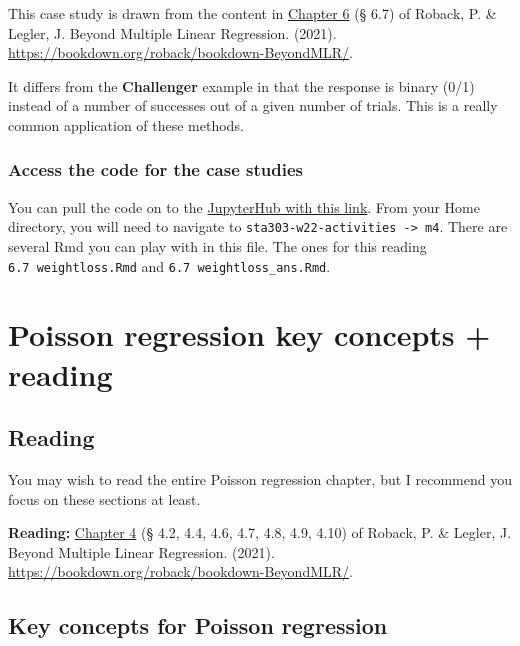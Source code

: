 \documentclass[
  openany]{book}
\begin{document}
This case study is drawn from the content in \href{https://bookdown.org/roback/bookdown-BeyondMLR/ch-logreg.html}{Chapter
6} (§
6.7) of Roback, P. \& Legler, J. Beyond Multiple Linear Regression.
(2021). \url{https://bookdown.org/roback/bookdown-BeyondMLR/}.

It differs from the \textbf{Challenger} example in that the response is
binary (0/1) instead of a number of successes out of a given number of
trials. This is a really common application of these methods.

\hypertarget{access-the-code-for-the-case-studies}{%
\subsubsection{Access the code for the case studies}\label{access-the-code-for-the-case-studies}}

You can pull the code on to the \href{https://jupyter.utoronto.ca/hub/user-redirect/git-pull?repo=https\%3A\%2F\%2Fgithub.com\%2Fsta303-bolton\%2Fsta303-w22-activities\&urlpath=rstudio\%2F}{JupyterHub with this
link}.
From your Home directory, you will need to navigate to
\texttt{sta303-w22-activities\ -\textgreater{}\ m4}. There are several Rmd you can play with
in this file. The ones for this reading \texttt{6.7\ weightloss.Rmd} and
\texttt{6.7\ weightloss\_ans.Rmd}.

\hypertarget{poisson-regression-key-concepts-reading}{%
\section{Poisson regression key concepts + reading}\label{poisson-regression-key-concepts-reading}}

\hypertarget{reading-1}{%
\subsection{Reading}\label{reading-1}}

You may wish to read the entire Poisson regression chapter, but I
recommend you focus on these sections at least.

\textbf{Reading:} \href{https://bookdown.org/roback/bookdown-BeyondMLR/ch-poissonreg.html}{Chapter
4} (§
4.2, 4.4, 4.6, 4.7, 4.8, 4.9, 4.10) of Roback, P. \& Legler, J. Beyond
Multiple Linear Regression. (2021).
\url{https://bookdown.org/roback/bookdown-BeyondMLR/}.

\hypertarget{key-concepts-for-poisson-regression}{%
\subsection{Key concepts for Poisson regression}\label{key-concepts-for-poisson-regression}}
\end{document}
